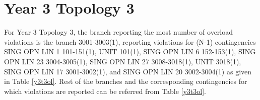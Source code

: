 \documentclass[10pt]{report}
\begin{document}
\begin{table}[H]
\caption{Branch overload violation count with contingencies - Year 2, Topology 2}
\label{y2t2ol}
\centering
{}
\end{table} 

\section{Year 3 Topology 3}

For Year 3 Topology 3, the branch reporting the most number of overload violations is the branch 3001-3003(1), reporting violations for (N-1) contingencies SING OPN LIN   1 101-151(1), UNIT 101(1), SING OPN LIN   6 152-153(1), SING OPN LIN   23 3004-3005(1), SING OPN LIN   27 3008-3018(1), UNIT 3018(1), SING OPN LIN   17 3001-3002(1), and SING OPN LIN   20 3002-3004(1) as given in Table \ref{y3t3ol}. Rest of the branches and the corresponding contingencies for which violations are reported can be referred from Table \ref{y3t3ol}. 
\end{document}
